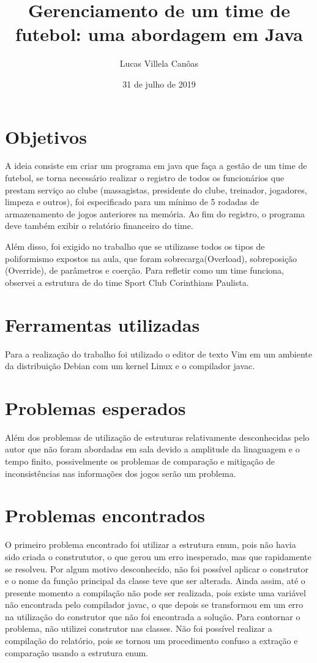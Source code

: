 \documentclass[11pt]{article}
\title{\textbf{Gerenciamento de um time de futebol: uma abordagem em Java}}
\author{Lucas Villela Canôas}
\date{31 de julho de 2019}
\begin{document}
\maketitle

\section{Objetivos}

A ideia consiste em criar um programa em java que faça a gestão de um time de futebol, se torna necessário realizar o registro de todos os funcionários que prestam serviço ao clube (massagistas, presidente do clube, treinador, jogadores, limpeza e outros), foi especificado para um mínimo de 5 rodadas de armazenamento de jogos anteriores na memória. Ao fim do registro, o programa deve também exibir o relatório financeiro do time.

Além disso, foi exigido no trabalho que se utilizasse todos os tipos de poliformismo expostos na aula, que foram sobrecarga(Overload), sobreposição (Override), de parâmetros e coerção.
Para refletir como um time funciona, observei a estrutura de do time Sport Club Corinthians Paulista.

\section{Ferramentas utilizadas}
Para a realização do trabalho foi utilizado o editor de texto Vim em um ambiente da distribuição Debian com um kernel Linux e o compilador javac.

\section{Problemas esperados}
Além dos problemas de utilização de estruturas relativamente desconhecidas pelo autor que não foram abordadas em sala devido a amplitude da linaguagem e o tempo finito, possivelmente os problemas de comparação e mitigação de inconsistências nas informações dos jogos serão um problema.

\section{Problemas encontrados}

O primeiro problema encontrado foi utilizar a estrutura enum, pois não havia sido criada o constrututor, o que gerou um erro inesperado, mas que rapidamente se resolveu.
Por algum motivo desconhecido, não foi possível aplicar o construtor e o nome da função principal da classe teve que ser alterada. Ainda assim, até o presente momento a compilação não pode ser realizada, pois existe uma variável não encontrada pelo compilador javac, o que depois se transformou em um erro na utilização do construtor que não foi encontrada a solução. Para contornar o problema, não utilizei construtor nas classes.
Não foi possível realizar a compilação do relatório, pois se tornou um procedimento confuso a extração e comparação usando a estrutura enum.
\end{document}
